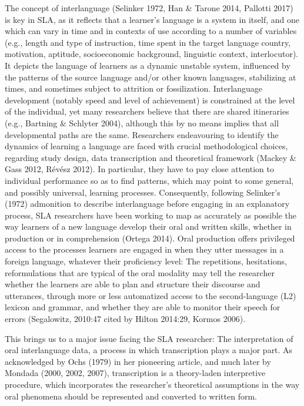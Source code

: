 \documentclass[11pt]{article}
\newenvironment{styleStandard}{\renewcommand\baselinestretch{1.0}\setlength\leftskip{0cm}\setlength\rightskip{0cm plus 1fil}\setlength\parindent{0cm}\setlength\parfillskip{0pt plus 1fil}\setlength\parskip{0in plus 1pt}\writerlistparindent\writerlistleftskip\leavevmode\normalfont\normalsize\writerlistlabel\ignorespaces}{\unskip\vspace{0.111in plus 0.0111in}\par}
\newcommand\writerlistleftskip{}
\newcommand\writerlistparindent{}
\newcommand\writerlistlabel{}
\begin{document}
\begin{styleStandard}
The concept of interlanguage (Selinker 1972, Han \& Tarone 2014, Pallotti 2017) is key in SLA, as it reflects that a learner’s language is a system in itself, and one which can vary in time and in contexts of use according to a number of variables (e.g., length and type of instruction, time spent in the target language country, motivation, aptitude, socioeconomic background, linguistic context, interlocutor). It depicts the language of learners as a dynamic unstable system, influenced by the patterns of the source language and/or other known languages, stabilizing at times, and sometimes subject to attrition or fossilization. Interlanguage development (notably speed and level of achievement) is constrained at the level of the individual, yet many researchers believe that there are shared itineraries (e.g., Bartning \& Schlyter 2004), although this by no means implies that all developmental paths are the same. Researchers endeavouring to identify the dynamics of learning a language are faced with crucial methodological choices, regarding study design, data transcription and theoretical framework (Mackey \& Gass 2012, Révész 2012). In particular, they have to pay close attention to individual performance so as to find patterns, which may point to some general, and possibly universal, learning processes. Consequently, following Selinker’s (1972) admonition to describe interlanguage before engaging in an explanatory process, SLA researchers have been working to map as accurately as possible the way learners of a new language develop their oral and written skills, whether in production or in comprehension (Ortega 2014). Oral production offers privileged access to the processes learners are engaged in when they utter messages in a foreign language, whatever their proficiency level: The repetitions, hesitations, reformulations that are typical of the oral modality may tell the researcher whether the learners are able to plan and structure their discourse and utterances, through more or less automatized access to the second-language (L2) lexicon and grammar, and whether they are able to monitor their speech for errors (Segalowitz, 2010:47 cited by Hilton 2014:29, Kormos 2006). 
\end{styleStandard}

\begin{styleStandard}
This brings us to a major issue facing the SLA researcher: The interpretation of oral interlanguage data, a process in which transcription plays a major part. As acknowledged by Ochs (1979) in her pioneering article, and much later by Mondada (2000, 2002, 2007), transcription is a theory-laden interpretive procedure, which incorporates the researcher’s theoretical assumptions in the way oral phenomena should be represented and converted to written form. 
\end{styleStandard}
\end{document}
